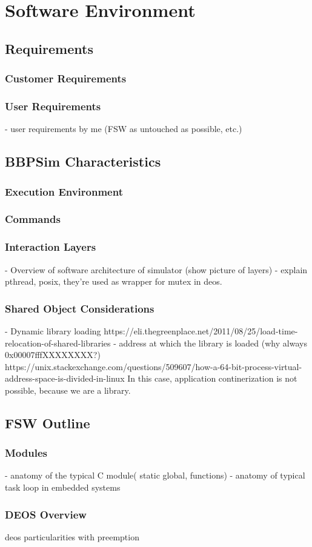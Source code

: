 {
\setlength{\parindent}{2em}
\chapter{Software Environment}\label{cha:sim-env}

\section{Requirements}
\subsection{Customer Requirements}
\subsection{User Requirements}
- user requirements by me (FSW as untouched as possible, etc.)

\section{BBPSim Characteristics}
\subsection{Execution Environment}
\subsection{Commands}
\subsection{Interaction Layers}
- Overview of software architecture of simulator (show picture of layers)
- explain pthread, posix, they're used as wrapper for mutex in deos.
\subsection{Shared Object Considerations}
- Dynamic library loading  https://eli.thegreenplace.net/2011/08/25/load-time-relocation-of-shared-libraries
- address at which the library is loaded (why always 0x00007fffXXXXXXXX?) https://unix.stackexchange.com/questions/509607/how-a-64-bit-process-virtual-address-space-is-divided-in-linux
In this case, application continerization is not possible, because we are a library.

\section{FSW Outline}
\subsection{Modules}
- anatomy of the typical C module( static global, functions)
- anatomy of typical task loop in embedded systems 
\subsection{DEOS Overview}
deos particularities with preemption
}